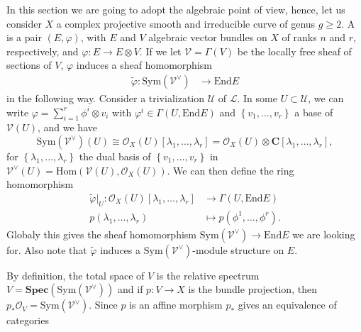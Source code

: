 \documentclass[12pt,a4paper]{book}
\theoremstyle{definition} \newtheorem{defn}[thm]{Definition}
\theoremstyle{definition} \newtheorem{ejemplo}[thm]{Example}
\theoremstyle{remark} \newtheorem{rem}[thm]{Remark}
\def\OO{\mathscr{O}}
\def\LL{\mathscr{L}}
\def\VV{\mathscr{V}}
\def\CC{\mathbf{C}}
\def\End{\mathrm{End}}
\def\Hom{\mathrm{Hom}}
\def\Sym{\mathrm{Sym}}
\def\RSpec{\mathbf{Spec}}
\let\emph\relax
\begin{document}
 In this section we are going to adopt the algebraic point of view, hence, let us consider $X$ a complex projective smooth and irreducible curve of genus $g\geq 2$. A \emph{$V$-twisted Higgs bundle} is a pair $(E,\varphi)$, with $E$ and $V$ algebraic vector bundles on $X$ of ranks $n$ and $r$, respectively, and $\varphi: E \rightarrow E\otimes V$. If we let $\VV=\Gamma(V)$ be the locally free sheaf of sections of $V$, $\varphi$ induces a sheaf homomorphism
 \begin{align*}
   \tilde{\varphi} :\Sym (\VV^\vee) &\longrightarrow \End E
   \end{align*}
   in the following way. Consider a trivialization $\mathcal{U}$ of $\LL$. In some $U\subset \mathcal{U}$, we can write $\varphi = \sum_{i=1}^r \phi^i \otimes v_i$ with $\varphi^i \in \Gamma(U, \End E)$ and $\left\{ v_1,\dots,v_r \right\}$ a base of $\VV(U)$, and we have
   \begin{equation*}
     \Sym(\VV^\vee)(U) \cong \OO_X(U)[\lambda_1,\dots,\lambda_r] = \OO_X(U) \otimes \CC[\lambda_1,\dots,\lambda_r],
   \end{equation*}
   for $\left\{\lambda_1,\dots,\lambda_r  \right\}$ the dual basis of $\left\{v_1,\dots,v_r \right\}$ in $\VV^\vee(U) = \Hom(\VV(U),\OO_X(U))$. We can then define the ring homomorphism
   \begin{align*}
     \tilde{\varphi}|_U :\OO_X(U)[\lambda_1,\dots,\lambda_r]&\longrightarrow \Gamma(U,\End E)\\ 
       p(\lambda_1,\dots,\lambda_r) &\longmapsto p(\phi^1,\dots,\phi^r). 
     \end{align*}
     Globaly this gives the sheaf homomorphism $\Sym(\VV^\vee) \rightarrow \End E$ we are looking for. Also note that $\tilde{\varphi}$ induces a $\Sym(\VV^\vee)$-module structure on $E$.

     By definition, the total space of $V$ is the relative spectrum $V=\RSpec(\Sym(\VV^\vee))$ and if $p:V\rightarrow X$ is the bundle projection, then $p_*\OO_V = \Sym(\VV^\vee)$. Since $p$ is an affine morphism $p_*$ gives an equivalence of categories
  \begin{center}
  \end{center}
\end{document}
